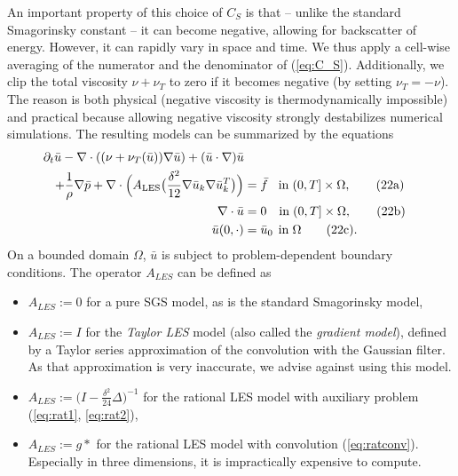 \documentclass[a4paper, 11pt, twoside]{article}
\begin{document}
An important property of this choice of $C_S$ is that -- unlike the standard Smagorinsky constant -- it can become negative, allowing for backscatter of energy. However, it can rapidly vary in space and time. We thus apply a cell-wise averaging of the numerator and the denominator of (\ref{eq:C_S}). Additionally, we clip the total viscosity $\nu + \nu_T$ to zero if it becomes negative (by setting $\nu_T = -\nu$). The reason is both physical (negative viscosity is thermodynamically impossible) and practical because allowing negative viscosity strongly destabilizes numerical simulations. The resulting models can be summarized by the equations \begin{align}
\label{eq:TurbSForm1}
    \partial_t \bar{u} -  \nabla \cdot  ((\nu + \nu_T(\bar{u}))\nabla\bar{u}) + (\bar{u} \cdot \nabla)\bar{u} \nonumber \\ + \frac{1}{\rho}\nabla \bar{p} + \nabla \cdot \Big(A_{\mathrm{LES}}\big(\frac{\delta^2}{12}\nabla \bar{u}_k \nabla \bar{u}_k^T\big)\Big) &= \bar{f} \hspace{0.3cm} \mathrm{in } \hspace{0.1cm} (0,T] \times \Omega, \tag{22a} \\
    \label{eq:TurbSForm2}
    \nabla \cdot \bar{u} &= 0 \hspace{0.35cm} \mathrm{in } \hspace{0.1cm} (0,T] \times \Omega, \tag{22b}\\
    \label{eq:TurbSForm3}
    \bar{u}(0,\cdot) &= \bar{u}_0 \hspace{0.15cm} \mathrm{in } \hspace{0.1cm} \Omega \tag{22c}.
\end{align}
 On a bounded domain $\Omega$, $\bar{u}$ is subject to problem-dependent boundary conditions. The operator $A_{LES}$ can be defined as 

\begin{itemize}
    \item $A_{LES}:=0$ for a pure SGS model, as is the standard Smagorinsky model,
    \item $A_{LES}:=I$ for the \textit{Taylor LES} model (also called the \textit{gradient model}), defined by a Taylor series approximation of the convolution with the Gaussian filter. As that approximation is very inaccurate, we advise against using this model.
    \item $A_{LES}:=\big(I-\frac{\delta^2}{24}\Delta\big)^{-1}$ for the rational LES model with auxiliary problem (\ref{eq:rat1}, \ref{eq:rat2}),
    \item $A_{LES} := g*$ for the rational LES model with convolution (\ref{eq:ratconv}). Especially in three dimensions, it is impractically expensive to compute.
\end{itemize} 
\end{document}
